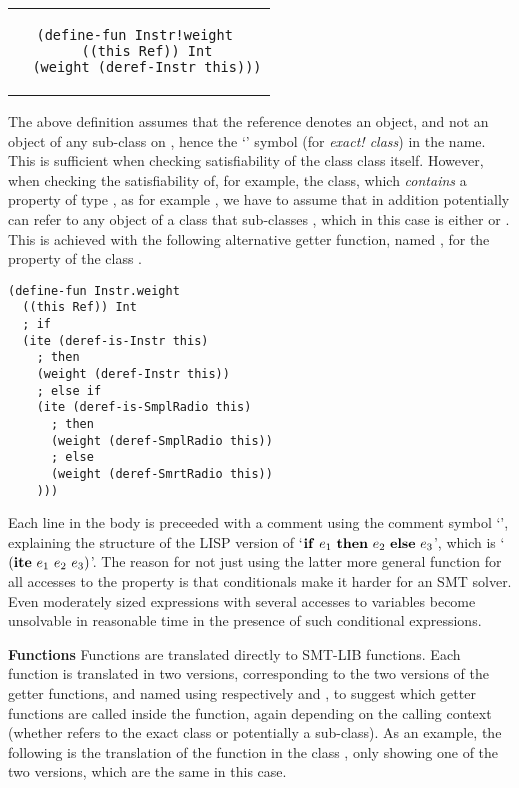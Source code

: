 \begin{center}
\begin{tabular}{c}
\small
\begin{lstlisting}
(define-fun Instr!weight 
  ((this Ref)) Int
  (weight (deref-Instr this)))
\end{lstlisting}
\end{tabular}
\end{center}

\noindent The above definition assumes that the  reference
denotes an  object, and not an object of any
sub-class on , hence the `\code{!}' symbol (for {\em
  exact!  class}) in the name.  This is sufficient when checking
satisfiability of the class  class itself. However,
when checking the satisfiability of, for example, the
 class, which {\em contains} a property of type
, as for example , we have
to assume that  in addition potentially can refer to any
object of a class that sub-classes , which in this
case is either  or . This is
achieved with the following alternative getter function, named
, for the  property of the class
.

\begin{center}
\small
\begin{lstlisting}
(define-fun Instr.weight 
  ((this Ref)) Int
  ; if
  (ite (deref-is-Instr this)         
    ; then
    (weight (deref-Instr this))      
    ; else if
    (ite (deref-is-SmplRadio this)      
      ; then
      (weight (deref-SmplRadio this))   
      ; else
      (weight (deref-SmrtRadio this))
    )))
\end{lstlisting}
\end{center}

\noindent Each line in the body is preceeded with a comment using the
comment symbol `\code{;}', explaining the structure of the LISP
version of `${\bf if}\ e_1\ {\bf then}\ e_2\ {\bf else}\ e_3$', which
is `$({\bf ite}\ e_1\ e_2\ e_3)$'. The reason for not just using the
latter more general function  for all accesses
to the  property is that conditionals make it harder for
an SMT solver. Even moderately sized expressions with several accesses
to variables become unsolvable in reasonable time in the presence of
such conditional expressions.

\textbf{Functions} Functions are translated directly to SMT-LIB
functions.  Each function is translated in two versions, corresponding
to the two versions of the getter functions, and named using
respectively  and
, to suggest which getter functions are
called inside the function, again depending on the calling context
(whether  refers to the exact class or potentially a
sub-class). As an example, the following is the translation of the
 function in the class , only showing one of
the two versions, which are the same in this case.

